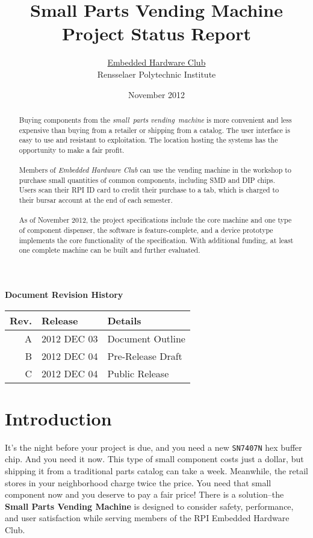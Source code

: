 \documentclass[12pt,oneside,final]{article}
\title{Small Parts Vending Machine\\ Project Status Report}
\author{\href{http://rpiEHC.org}{Embedded Hardware Club}\\ Rensselaer Polytechnic Institute}
\date{November 2012}
\begin{document}
\maketitle
\thispagestyle{empty}
\begin{abstract}
  \noindent
  Buying components from the \emph{small~parts vending~machine} is more convenient and less expensive than buying from a retailer or shipping from a catalog. The user interface is easy to use and resistant to exploitation. The location hosting the systems has the opportunity to make a fair profit.
  \\~\\
  \small
  Members of \emph{Embedded Hardware Club} can use the vending machine in the workshop to purchase small quantities of common components, including SMD and DIP chips. Users scan their RPI ID card to credit their purchase to a tab, which is charged to their bursar account at the end of each semester.
  \\~\\
  As of November 2012, the project specifications include the core machine and one type of component dispenser, the software is feature-complete, and a device prototype implements the core functionality of the specification. With additional funding, at least one complete machine can be built and further evaluated.
\end{abstract}
\pagebreak


\thispagestyle{empty}
\tableofcontents
\vfill
\begin{table}[b!]
  \centering
  \textbf{Document Revision History}\\
  \begin{tabular}{r | l l}
    \hline
    Rev.          & Release     & Details             \\
    \hline
    A             & 2012 DEC 03 & Document Outline    \\
    B             & 2012 DEC 04 & Pre-Release Draft   \\
    C             & 2012 DEC 04 & Public Release      \\
    \hline
  \end{tabular}
\end{table}
\pagebreak


\section{Introduction}
\label{sec:intro}

It's the night before your project is due, and you need a new \texttt{SN7407N} hex buffer chip. And you need it now. This type of small component costs just a dollar, but shipping it from a traditional parts catalog can take a week. Meanwhile, the retail stores in your neighborhood charge twice the price. You need that small component now and you deserve to pay a fair price! There is a solution--the \textbf{Small Parts Vending Machine} is designed to consider safety, performance, and user satisfaction while serving members of the RPI Embedded Hardware Club.
\end{document}
